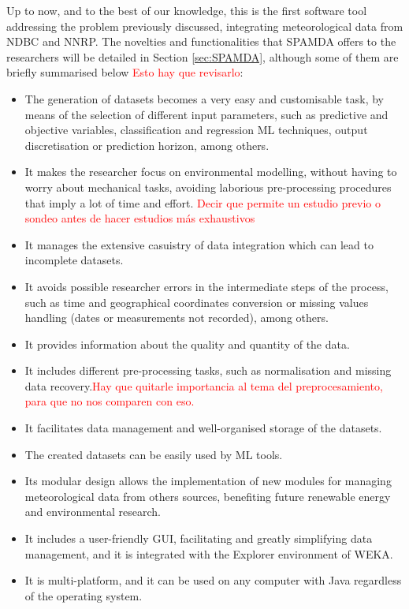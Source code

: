 \documentclass[energies,article,submit,moreauthors,pdftex]{Definitions/mdpi}
\begin{document}
		Up to now, and to the best of our knowledge, this is the first software tool addressing the problem previously discussed, integrating meteorological data from NDBC and NNRP. The novelties and functionalities that SPAMDA offers to the researchers will be detailed in Section \ref{sec:SPAMDA}, although some of them are briefly summarised below \textcolor{red}{Esto hay que revisarlo}:
		\begin{itemize}
			\item The generation of datasets becomes a very easy and customisable task, by means of the selection of different input parameters, such as predictive and objective variables, classification and regression ML techniques, output discretisation or prediction horizon, among others.
			\item It makes the researcher focus on environmental modelling, without having to worry about mechanical tasks, avoiding laborious pre-processing procedures that imply a lot of time and effort. \textcolor{red}{Decir que permite un estudio previo o sondeo antes de hacer estudios más exhaustivos}
			\item It manages the extensive casuistry of data integration which can lead to incomplete datasets.
			\item It avoids possible researcher errors in the intermediate steps of the process, such as time and geographical coordinates conversion or missing values handling (dates or measurements not recorded), among others.
			\item It provides information about the quality and quantity of the data.
			\item It includes different pre-processing tasks, such as normalisation and missing data recovery.\textcolor{red}{Hay que quitarle importancia al tema del preprocesamiento, para que no nos comparen con eso.}
			\item It facilitates data management and well-organised storage of the datasets.
			\item The created datasets can be easily used by ML tools.
			\item Its modular design allows the implementation of new modules for managing meteorological data from others sources, benefiting future renewable energy and environmental research.
			\item It includes a user-friendly GUI, facilitating and greatly simplifying data management, and it is integrated with the Explorer environment of WEKA.
			\item It is multi-platform, and it can be used on any computer with Java regardless of the operating system.
		\end{itemize}
		
\end{document}
